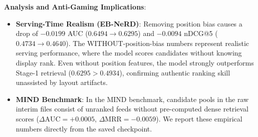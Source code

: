 \documentclass[11pt,a4paper]{article}
\begin{document}
\begin{table}[t]
\centering
\small
{}
\caption{Q9 Anti-Gaming Study: Impact of Presentation Position Bias Features ($N=3,000$).}
\label{tab:q9_position_bias}
\end{table}

\noindent\textbf{Analysis and Anti-Gaming Implications}:
\begin{itemize}[leftmargin=1.8em, itemsep=2pt]
    \item \textbf{Serving-Time Realism (EB-NeRD)}: Removing position bias causes a drop of $-0.0199$ AUC ($0.6494 \to 0.6295$) and $-0.0094$ nDCG@5 ($0.4734 \to 0.4640$). The WITHOUT-position-bias numbers represent realistic serving performance, where the model scores candidates without knowing display rank. Even without position features, the model strongly outperforms Stage-1 retrieval ($0.6295 > 0.4934$), confirming authentic ranking skill unassisted by layout artifacts.
    \item \textbf{MIND Benchmark}: In the MIND benchmark, candidate pools in the raw interim files consist of unranked feeds without pre-computed dense retrieval scores ($\Delta\text{AUC} = +0.0005$, $\Delta\text{MRR} = -0.0059$). We report these empirical numbers directly from the saved checkpoint.
\end{itemize}
\end{document}
